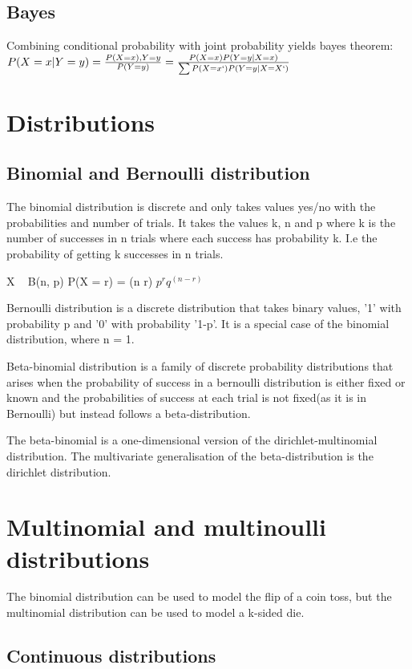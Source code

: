 \documentclass[11pt]{article}
\begin{document}
\subsection*{Bayes}
Combining conditional probability with joint probability yields bayes theorem: 
$P(X = x|Y = y) = \frac{P(X = x), Y = y}{P(Y = y)} = \frac{P(X = x)P(Y = y|X = x)}{\sum{P(X = x`)P(Y = y | X = X`)}}$

\section{Distributions}

\subsection{Binomial and Bernoulli distribution}
The binomial distribution is discrete and only takes values yes/no with the probabilities and number of trials. It takes the values k, n and p where k is the number of successes in n trials where each success has probability k.
I.e the probability of getting k successes in n trials.

X ~ B(n, p)
P(X = r) = (n  r) $p^r q^(n-r)$

Bernoulli distribution is a discrete distribution that takes binary values, '1' with probability p and '0' with probability '1-p'. It is a special case of the binomial distribution, where n = 1.

Beta-binomial distribution is a family of discrete probability distributions that arises when the probability of success in a bernoulli distribution is either fixed or known and the probabilities of success at each trial is not fixed(as it is in Bernoulli) but instead follows a beta-distribution. 

The beta-binomial is a one-dimensional version of the dirichlet-multinomial distribution. The multivariate generalisation of the beta-distribution is the dirichlet distribution. 

\section{Multinomial and multinoulli distributions}
The binomial distribution can be used to model the flip of a coin toss, but the multinomial distribution can be used to model a k-sided die. 

\subsection{Continuous distributions}
\end{document}
